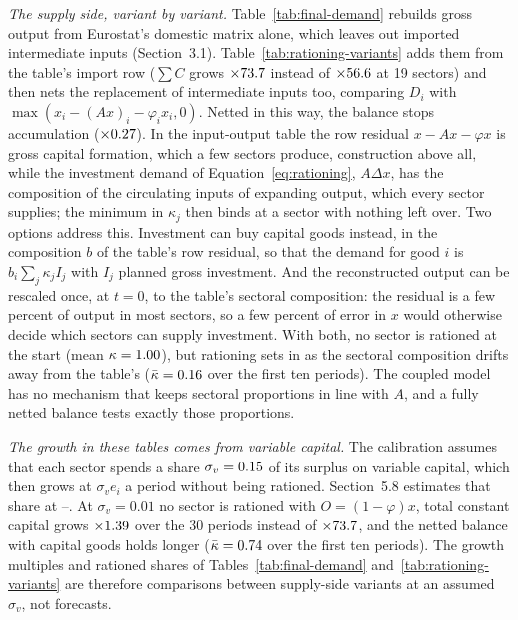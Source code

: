 \documentclass[11pt]{article}
\begin{document}
\emph{The supply side, variant by variant.} Table~\ref{tab:final-demand}
rebuilds gross output from Eurostat's domestic matrix alone, which leaves
out imported intermediate inputs (Section~3.1).
Table~\ref{tab:rationing-variants} adds them from the table's import row
($\sum C$ grows $\times73.7$ instead of
$\times56.6$ at 19 sectors) and then nets the replacement of
intermediate inputs too, comparing $D_i$ with
$\max(x_i-(Ax)_i-\varphi_ix_i,0)$. Netted in this way, the balance stops
accumulation ($\times0.27$). In the input-output table the
row residual $x-Ax-\varphi x$ is gross capital formation, which a few
sectors produce, construction above all, while the investment demand of
Equation~\eqref{eq:rationing}, $A\Delta x$, has the composition of the
circulating inputs of expanding output, which every sector supplies; the
minimum in $\kappa_j$ then binds at a sector with nothing left over. Two
options address this. Investment can buy capital goods instead, in the
composition $b$ of the table's row residual, so that the demand for good
$i$ is $b_i\sum_j\kappa_jI_j$ with $I_j$ planned gross investment. And
the reconstructed output can be rescaled once, at $t=0$, to the table's
sectoral composition: the residual is a few percent of output in most
sectors, so a few percent of error in $x$ would otherwise decide which
sectors can supply investment. With both, no sector is rationed at the
start (mean $\kappa=1.00$), but rationing sets in as the
sectoral composition drifts away from the table's ($\bar\kappa=0.16$
over the first ten periods). The coupled model has no mechanism that keeps
sectoral proportions in line with $A$, and a fully netted balance tests
exactly those proportions.

\emph{The growth in these tables comes from variable capital.} The
calibration assumes that each sector spends a share
$\sigma_v=0.15$ of its surplus on variable capital, which then
grows at $\sigma_ve_i$ a period without being rationed. Section~5.8
estimates that share at \EstSigmaVMin--\EstSigmaVMax. At $\sigma_v=0.01$
no sector is rationed with $O=(1-\varphi)x$, total constant capital
grows $\times1.39$ over the 30 periods instead of
$\times73.7$, and the netted balance with capital goods holds
longer ($\bar\kappa=0.74$ over the first ten
periods). The growth multiples and rationed shares of
Tables~\ref{tab:final-demand} and~\ref{tab:rationing-variants} are
therefore comparisons between supply-side variants at an assumed
$\sigma_v$, not forecasts.
\end{document}
